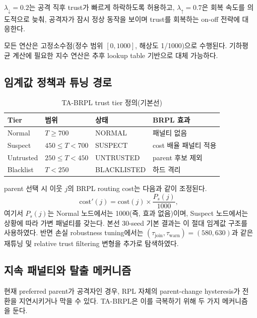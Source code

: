 \documentclass[12pt,a4paper]{article}
\begin{document}
$\lambda_\downarrow=0.2$는 공격 직후 trust가 빠르게 하락하도록 허용하고,
$\lambda_\uparrow=0.7$은 회복 속도를 의도적으로 늦춰,
공격자가 잠시 정상 동작을 보이며 trust를 회복하는 on-off 전략에 대응한다.

모든 연산은 고정소수점(정수 범위 $[0,1000]$, 해상도 1/1000)으로 수행된다.
기하평균 계산에 필요한 지수 연산은 추후 lookup table 기반으로 대체 가능하다.

\subsection{임계값 정책과 튜닝 경로}

\begin{table}[t]
  \centering
  \caption{TA-BRPL trust tier 정의(기본선)}
  \label{tab:thresholds}
  \begin{tabular}{lllp{3.2cm}}
    \toprule
    Tier & 범위 & 상태 & BRPL 효과 \\
    \midrule
    Normal    & $T \ge 700$       & NORMAL      & 패널티 없음 \\
    Suspect   & $450 \le T < 700$ & SUSPECT     & cost 배율 패널티 적용 \\
    Untrusted & $250 \le T < 450$ & UNTRUSTED   & parent 후보 제외 \\
    Blacklist & $T < 250$         & BLACKLISTED & 하드 격리 \\
    \bottomrule
  \end{tabular}
\end{table}

parent 선택 시 이웃 $j$의 BRPL routing cost는 다음과 같이 조정된다.
\begin{equation}
  \text{cost}'(j) = \text{cost}(j) \times \frac{P_s(j)}{1000},
\end{equation}
여기서 $P_s(j)$는 Normal 노드에서는 1000(즉, 효과 없음)이며,
Suspect 노드에서는 상황에 따라 가변 패널티를 갖는다.
본선 30-seed 기본 결과는 이 절대 임계값 구조를 사용하였다.
반면 손실 robustness tuning에서는
$(\tau_\text{join},\tau_\text{warn})=(580,630)$과 같은 재튜닝 및
relative trust filtering 변형을 추가로 탐색하였다.

\subsection{지속 패널티와 탈출 메커니즘}

현재 preferred parent가 공격자인 경우, RPL 자체의 parent-change hysteresis가
전환을 지연시키거나 막을 수 있다. TA-BRPL은 이를 극복하기 위해 두 가지 메커니즘을 둔다.
\end{document}
